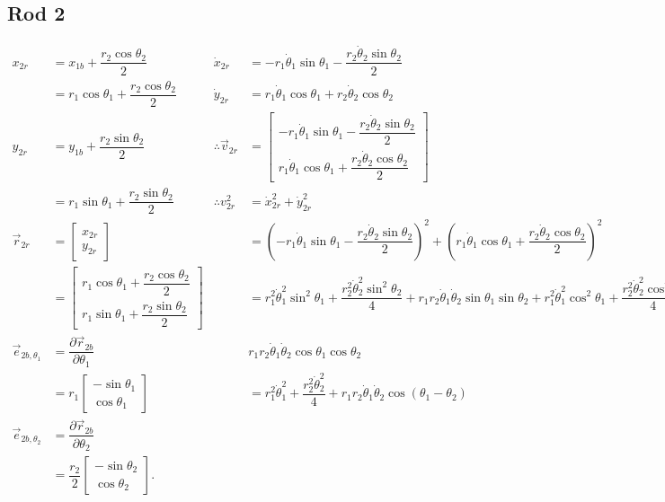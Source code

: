 \documentclass[12pt,a4paper,portrait]{article}
\begin{document}
	\subsection{Rod 2}
	\begin{align*}
		x_{2r} &= x_{1b} + \dfrac{r_2 \cos{\theta_2}}{2} &\dot{x}_{2r} &= -r_1\dot{\theta}_1 \sin{\theta_1}-\dfrac{r_2\dot{\theta}_2 \sin{\theta_2}}{2}\\
		&= r_1 \cos{\theta_1} + \dfrac{r_2 \cos{\theta_2}}{2} & \dot{y}_{2r} &= r_1\dot{\theta}_1 \cos{\theta_1}+r_2\dot{\theta}_2 \cos{\theta_2} \\ 
		y_{2r} &= y_{1b} + \dfrac{r_2 \sin{\theta_2}}{2} & \therefore \vec{v}_{2r} &= \begin{bmatrix}
			-r_1\dot{\theta}_1 \sin{\theta_1}-\dfrac{r_2\dot{\theta}_2 \sin{\theta_2}}{2}\\
			r_1\dot{\theta}_1 \cos{\theta_1}+\dfrac{r_2\dot{\theta}_2 \cos{\theta_2}}{2}
		\end{bmatrix}\\
		&= r_1 \sin{\theta_1} + \dfrac{r_2 \sin{\theta_2}}{2} & \therefore v_{2r}^2 &= \dot{x}_{2r}^2 + \dot{y}_{2r}^2 \\
		\vec{r}_{2r}&= \begin{bmatrix}
			x_{2r} \\
			y_{2r}
		\end{bmatrix}& &= \left(-r_1\dot{\theta}_1 \sin{\theta_1}-\dfrac{r_2\dot{\theta}_2 \sin{\theta_2}}{2}\right)^2 + \left(r_1\dot{\theta}_1 \cos{\theta_1}+\dfrac{r_2\dot{\theta}_2 \cos{\theta_2}}{2}\right)^2 \\
		&= \begin{bmatrix}
			r_1 \cos{\theta_1} + \dfrac{r_2 \cos{\theta_2}}{2}\\
			r_1 \sin{\theta_1} + \dfrac{r_2 \sin{\theta_2}}{2}
		\end{bmatrix} & &= r_1^2 \dot{\theta}_1^2 \sin^2{\theta_1} + \dfrac{r_2^2 \dot{\theta}_2^2 \sin^2{\theta_2}}{4} + r_1 r_2 \dot{\theta}_1\dot{\theta}_2 \sin{\theta_1}\sin{\theta_2} + r_1^2 \dot{\theta}_1^2 \cos^2{\theta_1} + \dfrac{r_2^2 \dot{\theta}_2^2 \cos^2{\theta_2}}{4} + \\
		\vec{e}_{2b,\theta_1} &= \dfrac{\partial \vec{r}_{2b}}{\partial \theta_1} && r_1 r_2 \dot{\theta}_1 \dot{\theta}_2 \cos{\theta_1}\cos{\theta_2} \\
		&= r_1\begin{bmatrix}
			-\sin{\theta_1} \\
			\cos{\theta_1}
		\end{bmatrix}& &= r_1^2 \dot{\theta}_1^2 + \dfrac{r_2^2 \dot{\theta}_2^2}{4} + r_1 r_2 \dot{\theta}_1 \dot{\theta}_2 \cos{\left(\theta_1-\theta_2\right)}\\
		\vec{e}_{2b,\theta_2} &= \dfrac{\partial \vec{r}_{2b}}{\partial \theta_2} \\
		&= \dfrac{r_2}{2} \begin{bmatrix}
			-\sin{\theta_2} \\
			\cos{\theta_2}
		\end{bmatrix}.
	\end{align*}
	 
\end{document}
